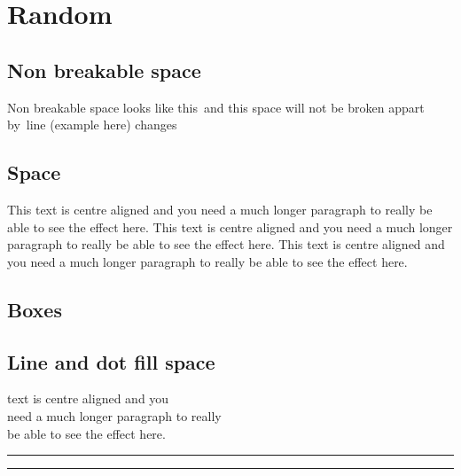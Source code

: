\documentclass[16pt,a4paper]{article}
\begin{document}
\section{Random}
\subsection{Non breakable space}

Non breakable space looks like this~and this space will not be broken appart by~line (example here) changes
\subsection{Space}
This text is centre \hspace{10mm} aligned and you need a much longer paragraph to really be able to see the effect here.
This text is centre aligned and you need a much longer paragraph to really be able to see the effect here.\vspace{2cm}
This text is centre aligned and you need a much longer paragraph to really be able to see the effect here.
\subsection{Boxes}

\subsection{Line and dot fill space}
text is centre aligned and you \hrulefill\\need a much longer paragraph to really \\be able to see the effect here.\\
\rule{\linewidth}{1mm}
\begin{center}
    \rule{3cm}{2mm}
\end{center}
\end{document}

